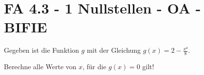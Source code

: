 \section{FA 4.3 - 1 Nullstellen - OA - BIFIE}

\begin{beispiel}[FA 4.3]{1} %
				Gegeben ist die Funktion $g$ mit der Gleichung $g(x)=2-\frac{x²}{8}$.

Berechne alle Werte von $x$, für die $g(x)=0$ gilt!

\end{beispiel}